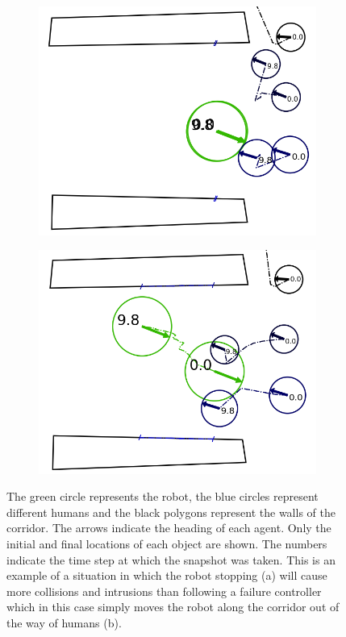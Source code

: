 \documentclass[letterpaper, 10 pt, conference]{ieeeconf}  %
\begin{document}
	\begin{figure}
		\centering
		\begin{subfigure}{0.49\linewidth}
			\includegraphics[width=\linewidth]{dnmotive}
			\caption{}
			\label{fig:dnmotivation}
		\end{subfigure}
		\begin{subfigure}{0.49\linewidth}
			\includegraphics[width=\linewidth]{rlmotive}
			\caption{}
		\end{subfigure}
		\caption{The green circle represents the robot, the blue circles represent different humans and the black polygons represent the walls of the corridor. The arrows indicate the heading of each agent. Only the initial and final locations of each object are shown. The numbers indicate the time step at which the snapshot was taken. This is an example of a situation in which the robot stopping (a) will cause more collisions and intrusions than following a failure controller which in this case simply moves the robot along the corridor out of the way of humans (b).}
		\label{fig:motivation}
	\end{figure}
	
\end{document}
